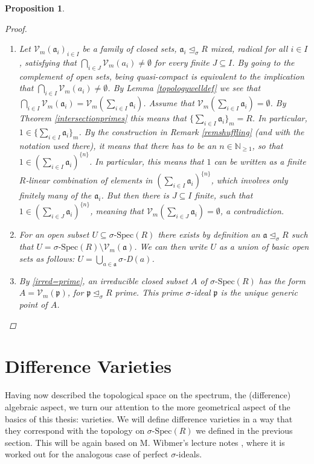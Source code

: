 \documentclass{article}
\def\NE{\mathbb{N}_{\geq1}}
\def\Vm{\mathcal{V}_m}
\def\a{\mathfrak{a}}
\def\p{\mathfrak{p}}
\def\s{\sigma}
\def\si{\unlhd_{\sigma}}
\def\sSpec{\sigma\text{-Spec}}
\newenvironment{bew}{\begin{proof}[Proof]}{\end{proof}}
\theoremstyle{plain}
\newtheorem{prop}[Satz]{Proposition}
\theoremstyle{definition}
\begin{document}
\begin{prop}
\begin{bew}
\begin{enumerate}
\item Let $\Vm(\a_i)_{i \in I}$ be a family of closed sets, $\a_i \si R$ mixed, radical for all $i \in I$, satisfying that 
$\bigcap_{i \in J} \Vm( a_i) \neq \emptyset$ for every finite $J \subseteq I$. By  going to the complement of open sets, being quasi-compact is equivalent to the implication that $\bigcap_{i \in I} \Vm(a_i) \neq \emptyset$.
By Lemma \ref{topologywelldef} we see that $\bigcap_{i \in I} \Vm( \a_i) = \Vm ( \sum_{i \in I} \a_i)$. Assume that $ \Vm ( \sum_{i \in I} \a_i) = \emptyset$. 
By Theorem \ref{intersectionprimes} this means that $\{ \sum_{i \in I} \a_i \}_m = R$. In particular, $1 \in \{ \sum_{i \in I} \a_i \}_m$. By the construction in Remark \ref{remshuffling} (and with the notation used there), it means that there has to be an $n \in \NE$,
so that $1 \in (\sum_{i \in I} \a_i )^{\{n\}}$. In particular, this means that $1$ can be written as a finite $R$-linear combination of elements in $(\sum_{i \in I} \a_i )^{\{n\}}$, which involves only finitely many of the $\a_i$.
But then there is $J \subseteq I$ finite, such that $1 \in (\sum_{i \in J} \a_i)^{\{n\}}$, meaning that $\Vm(\sum_{i \in J} \a_i) = \emptyset$, a contradiction. 
\item For an open subset $U \subseteq \sSpec(R)$ there exists by definition an $\a \si R$ such that $U = \sSpec(R) \setminus \Vm(\a)$. We can then write $U$ as a union of basic open sets as follows: $U = \bigcup_{a \in \a} \s$-D$(a)$.
\item By \ref{irred=prime}, an irreducible closed subset $A$ of $\sSpec(R)$ has the form $A = \Vm(\p)$, for $\p \si R$ prime. This prime $\s$-ideal $\p$ is the unique generic point of $A$.
\end{enumerate}
\end{bew}
\end{prop}

\clearpage
\section{Difference Varieties}


Having now described the topological space on the spectrum, the (difference) algebraic aspect, we turn our attention to the more geometrical aspect of the basics of this thesis: varieties.
We will define difference varieties in a way that they correspond with the topology on $\sSpec(R)$ we defined in the previous section. This will be again based on M. Wibmer's lecture notes \cite{wibmer}, 
where it is worked out for the analogous case of perfect $\s$-ideals.
\end{document}
